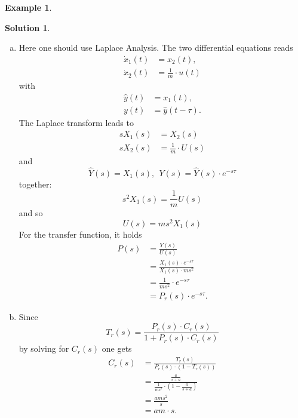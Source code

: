 \documentclass[a4paper,12 pt]{article}
\numberwithin{equation}{section}
\theoremstyle{definition}
\newtheorem{bsp}{Example}
\theoremstyle{remark}
\theoremstyle{definition}
\newtheorem*{lsg}{Solution}
\theoremstyle{definition}
\theoremstyle{definition}
\theoremstyle{remark}
\begin{document}
\begin{bsp}
\begin{lsg}
\begin{enumerate}[(a)]
\item Here one should use Laplace Analysis. The two differential equations reads
\begin{equation*}
\begin{split}
\dot{x}_1(t)&=x_2(t), \\
\dot{x}_2(t)&=\frac{1}{m}\cdot u(t)
\end{split}
\end{equation*}
with
\begin{equation*}
\begin{split}
\hat{y}(t)&=x_1(t), \\
y(t)&=\hat{y}(t-\tau).
\end{split}
\end{equation*}
The Laplace transform leads to
\begin{equation*}
\begin{split}
sX_1(s)&=X_2(s)\\
sX_2(s)&=\frac{1}{m}\cdot U(s)
\end{split}
\end{equation*}
and
\begin{equation*}
\hat{Y}(s)=X_1(s), \ \ Y(s)=\hat{Y}(s)\cdot e^{-s\tau}
\end{equation*}
together:
$$s^2X_1(s)=\frac{1}{m}U(s)$$
and so
$$U(s)=ms^2X_1(s)$$
For the transfer function, it holds
\begin{equation*}
\begin{split}
P(s)&=\frac{Y(s)}{U(s)}\\
&=\frac{X_1(s)\cdot e^{-s\tau}}{X_1(s)\cdot ms^2}\\
&=\frac{1}{ms^2}\cdot e^{-s\tau}\\
&=P_r(s)\cdot e^{-s\tau}.
\end{split}

\end{equation*}

\item Since
\begin{equation*}
T_r(s)=\frac{P_r(s)\cdot C_r(s)}{1+P_r(s)\cdot C_r(s)}
\end{equation*}
by solving for $C_r(s)$ one gets
\begin{equation*}
\begin{split}
C_r(s)&=\frac{T_r(s)}{P_r(s)\cdot (1-T_r(s))}\\
&= \frac{\frac{a}{s+a}}{\frac{1}{ms^2}\cdot \left(1-\frac{a}{s+a}\right)}\\
&=\frac{ams^2}{s}\\
&=am\cdot s.
\end{split}
\end{equation*}





\end{enumerate}


\end{lsg}


\end{bsp}
\end{document}
